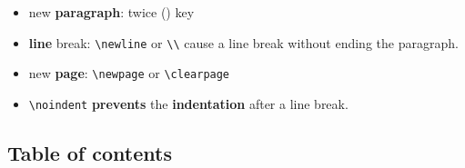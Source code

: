 \begin{frame}[fragile]


\begin{itemize}
	\item new \textbf{paragraph}: twice  () key
	
	\item \textbf{line} break: \lstinline|\newline| or \lstinline|\\| cause a line break without ending the paragraph.
	
	\item new \textbf{page}: \lstinline|\newpage| or \lstinline|\clearpage| 
	
	\item \lstinline|\noindent| \textbf{prevents} the \textbf{indentation} after a line break.
	
\end{itemize}

\end{frame}


\subsection{Table of contents}

